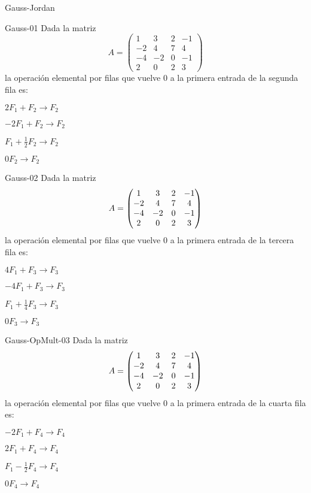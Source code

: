 \documentclass[a4,11pt]{aleph-notas}
\begin{document}
\begin{quiz}{Gauss-Jordan}

\begin{multi}[]%
    {Gauss-01}
    Dada la matriz 
    \[
        A= \begin{pmatrix} 1 & 3 & 2 & -1 \\ -2 & 4 & 7 & 4  \\ -4 & -2 & 0 & -1 \\ 2 & 0 & 2 & 3\end{pmatrix} 
    \] 
    la operación elemental por filas que vuelve $0$ a la primera entrada de la segunda fila es:
    \item* $2F_1+F_2\to F_2$
    \item $-2F_1+F_2\to F_2$
    \item $F_1+\frac{1}{2}F_2\to F_2$
    \item $0F_2\to F_2$
\end{multi}

\begin{multi}{Gauss-02}
    Dada la matriz \[A= \begin{pmatrix} 1 & 3 & 2 & -1 \cr -2 & 4 & 7 & 4  \cr -4 & -2 & 0 & -1 \cr 2 & 0 & 2 & 3\end{pmatrix} \] la operación elemental por filas que vuelve $0$ a la primera entrada de la tercera fila es:
    \item* $4F_1+F_3\to F_3$
    \item $-4F_1+F_3\to F_3$
    \item $F_1+\frac{1}{4}F_3\to F_3$
    \item $0F_3\to F_3$
\end{multi}

\begin{multi}{Gauss-OpMult-03}
    Dada la matriz \[A= \begin{pmatrix} 1 & 3 & 2 & -1 \cr -2 & 4 & 7 & 4  \cr -4 & -2 & 0 & -1 \cr 2 & 0 & 2 & 3\end{pmatrix} \] la operación elemental por filas que vuelve $0$ a la primera entrada de la cuarta fila es:
    \item* $-2F_1+F_4\to F_4$
    \item $2F_1+F_4\to F_4$
    \item $F_1-\frac{1}{2}F_4\to F_4$
    \item $0F_4\to F_4$
\end{multi}


\end{quiz}
\end{document}
